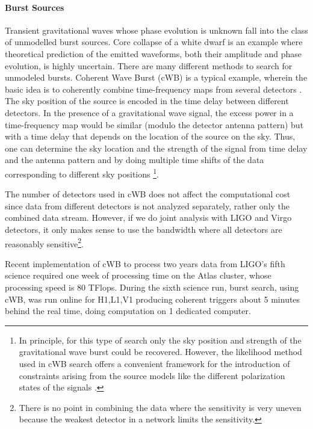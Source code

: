 \paragraph{Burst Sources}  
Transient gravitational waves whose phase evolution is unknown
fall into the class of unmodelled burst sources.  Core collapse of a 
white dwarf is an example where theoretical prediction of the emitted
waveforms, both their amplitude and phase evolution, is highly 
uncertain.  There are many different methods to search for 
unmodeled bursts. Coherent Wave Burst (cWB) is a typical example, 
wherein the basic idea is to coherently combine time-frequency 
maps from several detectors \cite{KLIMENKO2011}. The sky position 
of the source is encoded in the time delay between different
detectors.  In the presence of a gravitational wave signal, 
the excess power in a time-frequency map would be  similar 
(modulo the detector antenna pattern) but with a time delay that
depends on the location of the source on the sky. Thus, one 
can determine the sky location and the strength of the signal from 
time delay and the antenna pattern and by doing multiple time 
shifts of the data corresponding  to different sky positions 
\footnote{In principle, for this type of search only the sky 
position and strength of the gravitational wave burst could be 
recovered. However, the likelihood method used in cWB search 
offers a convenient framework for the introduction of constraints 
arising from the source models like the different polarization 
states of the signals \cite{KLIMENKO2011}.}.

The number of detectors used in cWB does not affect  the 
computational cost since data from different detectors is
not analyzed separately, rather only the combined data stream. 
However, if we do joint analysis with LIGO and Virgo detectors, 
it only makes sense to use the bandwidth where all detectors are 
reasonably sensitive\footnote{There is no point in combining the 
data where the sensitivity is very uneven because the weakest detector 
in a network limits the sensitivity.}. %

Recent implementation of cWB to process two years data from LIGO's 
fifth science required one week of processing time on the Atlas cluster,
whose processing speed is 80 TFlops.
During the sixth science run,  burst 
search, using cWB, was run online for H1,L1,V1 producing coherent 
triggers about 5 minutes behind the real time, doing computation 
on 1 dedicated computer. 


